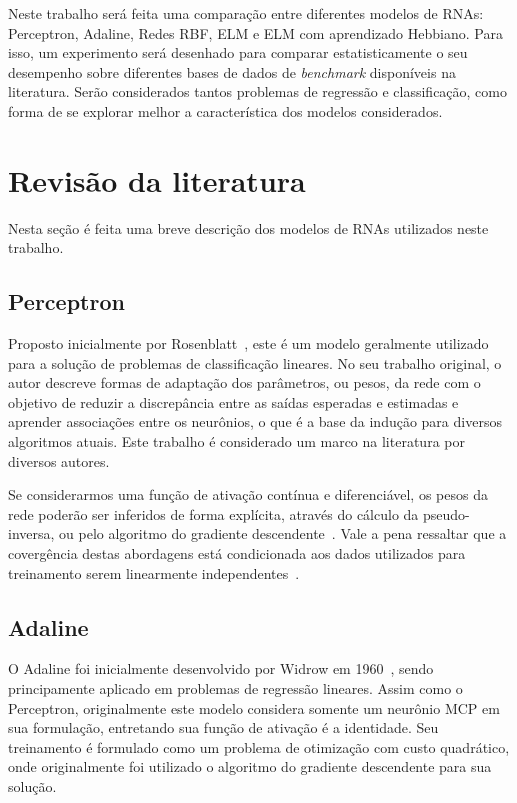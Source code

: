 \documentclass[conference]{IEEEtran}
\begin{document}
	Neste trabalho será feita uma comparação entre diferentes modelos de RNAs: Perceptron, Adaline, Redes RBF, ELM e ELM com aprendizado Hebbiano. Para isso, um experimento será desenhado para comparar estatisticamente o seu desempenho sobre diferentes bases de dados de \textit{benchmark} disponíveis na literatura. Serão considerados tantos problemas de regressão e classificação, como forma de se explorar melhor a característica dos modelos considerados. 
	

	\section{Revisão da literatura}
	Nesta seção é feita uma breve descrição dos modelos de RNAs utilizados neste trabalho.
	
	\subsection{Perceptron}
	Proposto inicialmente por Rosenblatt~\cite{rosenblatt1957perceptron}, este é um modelo geralmente utilizado para a solução de problemas de classificação lineares. No seu trabalho original, o autor descreve formas de adaptação dos parâmetros, ou pesos, da rede com o objetivo de reduzir a discrepância entre as saídas esperadas e estimadas e aprender associações entre os neurônios, o que é a base da indução para diversos algoritmos atuais. Este trabalho é considerado um marco na literatura por diversos autores.
	
	Se considerarmos uma função de ativação contínua e diferenciável, os pesos da rede poderão ser inferidos de forma explícita, através do cálculo da pseudo-inversa, ou pelo algoritmo do gradiente descendente~\cite{hertz1991introduction}. Vale a pena ressaltar que a covergência destas abordagens está condicionada aos dados utilizados para treinamento serem linearmente independentes~\cite{hertz1991introduction}.
	
	\subsection{Adaline}
	O Adaline foi inicialmente desenvolvido por Widrow em 1960~\cite{widrow1960adaptive}, sendo principamente aplicado em problemas de regressão lineares. Assim como o Perceptron, originalmente este modelo considera somente um neurônio MCP em sua formulação, entretando sua função de ativação é a identidade. Seu treinamento é formulado como um problema de otimização com custo quadrático, onde originalmente foi utilizado o algoritmo do gradiente descendente para sua solução. 
	
\end{document}
